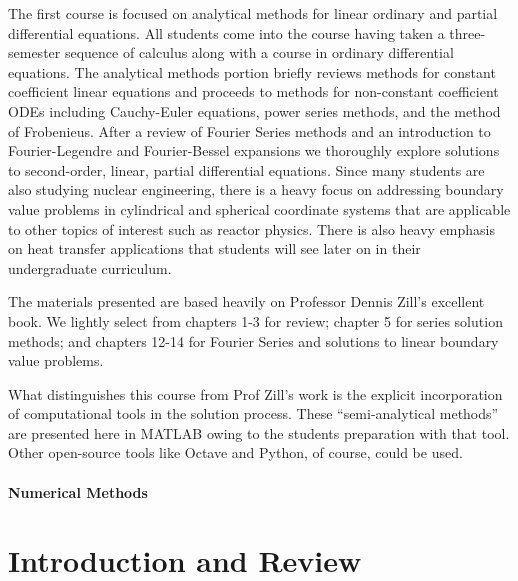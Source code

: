 \documentclass{tufte-book}
\theoremstyle{break}
\begin{document}
The first course is focused on analytical methods for linear ordinary and partial differential equations.  All students come into the course having taken a three-semester sequence of calculus along with a course in ordinary differential equations.  The analytical methods portion briefly reviews methods for constant coefficient linear equations and proceeds to methods for non-constant coefficient ODEs including Cauchy-Euler equations, power series methods, and the method of Frobenieus.  After a review of Fourier Series methods and an introduction to Fourier-Legendre and Fourier-Bessel expansions we thoroughly explore solutions to second-order, linear, partial differential equations.  Since many students are also studying nuclear engineering, there is a heavy focus on addressing boundary value problems in cylindrical and spherical coordinate systems that are applicable to other topics of interest such as reactor physics.  There is also heavy emphasis on heat transfer applications that students will see later on in their undergraduate curriculum.

The materials presented are based heavily on Professor Dennis Zill's excellent book.\cite[-3cm]{zill2020advanced} We lightly select from chapters 1-3 for review; chapter 5 for series solution methods; and chapters 12-14 for Fourier Series and solutions to linear boundary value problems.  

What distinguishes this course from Prof Zill's work is the explicit incorporation of computational tools in the solution process.  These ``semi-analytical methods'' are presented here in MATLAB\cite[-3.75cm]{matlab} owing to the students preparation with that tool.  Other open-source tools like Octave\cite[-3.5cm]{octave} and Python,\cite[-1cm]{10.5555/1593511} of course, could be used. 

\subsection*{Numerical Methods}

\mainmatter

\part{Introduction and Review}









\end{document}
